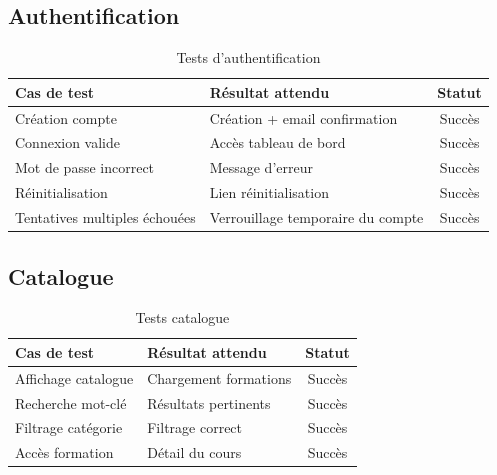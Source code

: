 \documentclass[12pt, a4paper]{report}
\begin{document}
\subsection{Authentification}
\begin{table}[H]
\centering
\caption{Tests d'authentification}
\begin{tabularx}{\textwidth}{|p{4cm}|X|c|}
\hline
\textbf{Cas de test} & \textbf{Résultat attendu} & \textbf{Statut} \\
\hline
Création compte & Création + email confirmation & Succès \\
\hline
Connexion valide & Accès tableau de bord & Succès \\
\hline
Mot de passe incorrect & Message d'erreur & Succès \\
\hline
Réinitialisation & Lien réinitialisation & Succès \\
\hline
Tentatives multiples échouées & Verrouillage temporaire du compte & Succès \\
\hline
\end{tabularx}
\end{table}

\subsection{Catalogue}
\begin{table}[H]
\centering
\caption{Tests catalogue}
\begin{tabularx}{\textwidth}{|p{4cm}|X|c|}
\hline
\textbf{Cas de test} & \textbf{Résultat attendu} & \textbf{Statut} \\
\hline
Affichage catalogue & Chargement formations & Succès \\
\hline
Recherche mot-clé & Résultats pertinents & Succès \\
\hline
Filtrage catégorie & Filtrage correct & Succès \\
\hline
Accès formation & Détail du cours & Succès \\
\hline
\end{tabularx}
\end{table}
\end{document}
